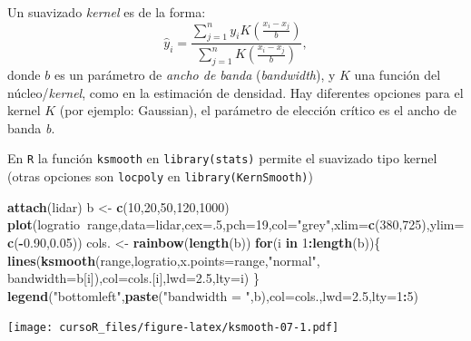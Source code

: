 \documentclass[]{book}
\newenvironment{Shaded}{\begin{snugshade}}{\end{snugshade}}
\newcommand{\KeywordTok}[1]{\textcolor[rgb]{0.13,0.29,0.53}{\textbf{#1}}}
\newcommand{\DataTypeTok}[1]{\textcolor[rgb]{0.13,0.29,0.53}{#1}}
\newcommand{\DecValTok}[1]{\textcolor[rgb]{0.00,0.00,0.81}{#1}}
\newcommand{\FloatTok}[1]{\textcolor[rgb]{0.00,0.00,0.81}{#1}}
\newcommand{\StringTok}[1]{\textcolor[rgb]{0.31,0.60,0.02}{#1}}
\newcommand{\ControlFlowTok}[1]{\textcolor[rgb]{0.13,0.29,0.53}{\textbf{#1}}}
\newcommand{\OperatorTok}[1]{\textcolor[rgb]{0.81,0.36,0.00}{\textbf{#1}}}
\newcommand{\NormalTok}[1]{#1}
\begin{document}
Un suavizado \emph{kernel} es de la forma: \[
\hat{y}_i = \frac{\sum_{j=1}^n y_i K\left( \frac{x_i-x_j}{b}\right)}{\sum_{j=1}^n K\left( \frac{x_i-x_j}{b}\right)},
\] donde \(b\) es un parámetro de \emph{ancho de banda}
(\emph{bandwidth}), y \(K\) una función del núcleo/\emph{kernel}, como
en la estimación de densidad. Hay diferentes opciones para el kernel
\(K\) (por ejemplo: Gaussian), el parámetro de elección crítico es el
ancho de banda \emph{b}.

En \texttt{R} la función \texttt{ksmooth} en \texttt{library(stats)}
permite el suavizado tipo kernel (otras opciones son \texttt{locpoly} en
\texttt{library(KernSmooth)})

\begin{Shaded}
\begin{Highlighting}[]
\KeywordTok{attach}\NormalTok{(lidar)}
\NormalTok{b <-}\StringTok{ }\KeywordTok{c}\NormalTok{(}\DecValTok{10}\NormalTok{,}\DecValTok{20}\NormalTok{,}\DecValTok{50}\NormalTok{,}\DecValTok{120}\NormalTok{,}\DecValTok{1000}\NormalTok{)}
\KeywordTok{plot}\NormalTok{(logratio}\OperatorTok{~}\NormalTok{range,}\DataTypeTok{data=}\NormalTok{lidar,}\DataTypeTok{cex=}\NormalTok{.}\DecValTok{5}\NormalTok{,}\DataTypeTok{pch=}\DecValTok{19}\NormalTok{,}\DataTypeTok{col=}\StringTok{"grey"}\NormalTok{,}\DataTypeTok{xlim=}\KeywordTok{c}\NormalTok{(}\DecValTok{380}\NormalTok{,}\DecValTok{725}\NormalTok{),}\DataTypeTok{ylim=}\KeywordTok{c}\NormalTok{(}\OperatorTok{-}\FloatTok{0.90}\NormalTok{,}\FloatTok{0.05}\NormalTok{))}
\NormalTok{cols. <-}\StringTok{ }\KeywordTok{rainbow}\NormalTok{(}\KeywordTok{length}\NormalTok{(b))}
\ControlFlowTok{for}\NormalTok{(i }\ControlFlowTok{in} \DecValTok{1}\OperatorTok{:}\KeywordTok{length}\NormalTok{(b))\{}
  \KeywordTok{lines}\NormalTok{(}\KeywordTok{ksmooth}\NormalTok{(range,logratio,}\DataTypeTok{x.points=}\NormalTok{range,}\StringTok{"normal"}\NormalTok{, }\DataTypeTok{bandwidth=}\NormalTok{b[i]),}\DataTypeTok{col=}\NormalTok{cols.[i],}\DataTypeTok{lwd=}\FloatTok{2.5}\NormalTok{,}\DataTypeTok{lty=}\NormalTok{i)}
\NormalTok{\}}
\KeywordTok{legend}\NormalTok{(}\StringTok{"bottomleft"}\NormalTok{,}\KeywordTok{paste}\NormalTok{(}\StringTok{"bandwidth = "}\NormalTok{,b),}\DataTypeTok{col=}\NormalTok{cols.,}\DataTypeTok{lwd=}\FloatTok{2.5}\NormalTok{,}\DataTypeTok{lty=}\DecValTok{1}\OperatorTok{:}\DecValTok{5}\NormalTok{)}
\end{Highlighting}
\end{Shaded}

\texttt{[image: cursoR\_files/figure-latex/ksmooth-07-1.pdf]}
\end{document}
